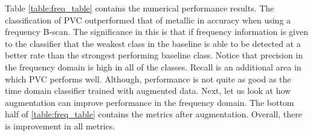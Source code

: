 \hspace{0.5in}Table \ref{table:freq_table} contains the numerical performance results. The classification of PVC outperformed that of metallic in accuracy when using a frequency B-scan. The significance in this is that if frequency information is given to the classifier that the weakest class in the baseline is able to be detected at a better rate than the strongest performing baseline class. Notice that precision in the frequency domain is high in all of the classes. Recall is an additional area in which PVC performs well. Although, performance is not quite as good as the time domain classifier trained with augmented data. Next, let us look at how augmentation can improve performance in the frequency domain. The bottom half of \ref{table:freq_table} contains the metrics after augmentation. Overall, there is improvement in all metrics. 
\vspace{0.5\baselineskip}

